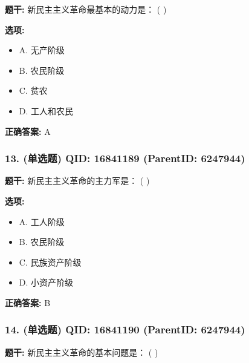 \documentclass[12pt,UTF8]{ctexart}
\begin{document}
\textbf{题干:}
新民主主义革命最基本的动力是： ( )



\textbf{选项:}
\begin{itemize}[leftmargin=*]

  \item A. 无产阶级

  \item B. 农民阶级

  \item C. 贫农

  \item D. 工人和农民

\end{itemize}

\textbf{正确答案:}
A

\vspace{0.3em}\hrulefill\vspace{0.7em}

\subsubsection*{13. (单选题) \small QID: 16841189 (ParentID: 6247944)}

\textbf{题干:}
新民主主义革命的主力军是： ( )



\textbf{选项:}
\begin{itemize}[leftmargin=*]

  \item A. 工人阶级

  \item B. 农民阶级

  \item C. 民族资产阶级

  \item D. 小资产阶级

\end{itemize}

\textbf{正确答案:}
B

\vspace{0.3em}\hrulefill\vspace{0.7em}

\subsubsection*{14. (单选题) \small QID: 16841190 (ParentID: 6247944)}

\textbf{题干:}
新民主主义革命的基本问题是： ( )
\end{document}
